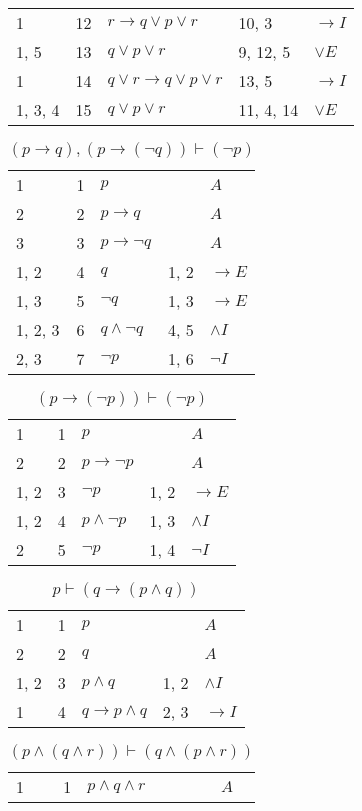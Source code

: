 \documentclass{article}
\begin{document}
\begin{table}[htbp]
\begin{tabular}{lrlll}
{1} & 12 & $r→q∨p∨r$ & {10, 3} & $→I$ \\
{1, 5} & 13 & $q∨p∨r$ & {9, 12, 5} & $∨E$ \\
{1} & 14 & $q∨r→q∨p∨r$ & {13, 5} & $→I$ \\
{1, 3, 4} & 15 & $q∨p∨r$ & {11, 4, 14} & $∨E$ \\
\end{tabular}
\end{table}\begin{table}[htbp]\caption*{$(p→q),(p→(¬q)) ⊢ (¬p)$}\centering\begin{tabular}{lrlll}
{1} & 1 & $p$ & {} & $A$ \\
{2} & 2 & $p→q$ & {} & $A$ \\
{3} & 3 & $p→ ¬q$ & {} & $A$ \\
{1, 2} & 4 & $q$ & {1, 2} & $→E$ \\
{1, 3} & 5 & $¬q$ & {1, 3} & $→E$ \\
{1, 2, 3} & 6 & $q∧ ¬q$ & {4, 5} & $∧I$ \\
{2, 3} & 7 & $¬p$ & {1, 6} & $¬I$ \\
\end{tabular}
\end{table}\begin{table}[htbp]\caption*{$(p→(¬p)) ⊢ (¬p)$}\centering\begin{tabular}{lrlll}
{1} & 1 & $p$ & {} & $A$ \\
{2} & 2 & $p→ ¬p$ & {} & $A$ \\
{1, 2} & 3 & $¬p$ & {1, 2} & $→E$ \\
{1, 2} & 4 & $p∧ ¬p$ & {1, 3} & $∧I$ \\
{2} & 5 & $¬p$ & {1, 4} & $¬I$ \\
\end{tabular}
\end{table}\begin{table}[htbp]\caption*{$p ⊢ (q→(p∧q))$}\centering\begin{tabular}{lrlll}
{1} & 1 & $p$ & {} & $A$ \\
{2} & 2 & $q$ & {} & $A$ \\
{1, 2} & 3 & $p∧q$ & {1, 2} & $∧I$ \\
{1} & 4 & $q→p∧q$ & {2, 3} & $→I$ \\
\end{tabular}
\end{table}\begin{table}[htbp]\caption*{$(p∧(q∧r)) ⊢ (q∧(p∧r))$}\centering\begin{tabular}{lrlll}
{1} & 1 & $p∧q∧r$ & {} & $A$ \\

\end{tabular}
\end{table}
\end{document}

